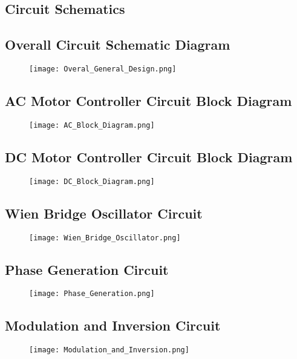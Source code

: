 \documentclass[12pt]{article}
\begin{document}
\begin{appendices}
\pagebreak

\section{Circuit Schematics}

\subsection{Overall Circuit Schematic Diagram}
\begin{figure}[H]
\centering
\texttt{[image: Overal\_General\_Design.png]}
\label{Overall_Design_V1}
\end{figure}
\subsection{AC Motor Controller Circuit Block Diagram}
\begin{figure}[H]
\centering
\texttt{[image: AC\_Block\_Diagram.png]}
\label{Overall_Design_V1}
\end{figure}
\subsection{DC Motor Controller Circuit Block Diagram}
\begin{figure}[H]
\centering
\texttt{[image: DC\_Block\_Diagram.png]}
\label{Overall_Design_V1}
\end{figure}
\subsection{Wien Bridge Oscillator Circuit}
\begin{figure}[H]
\centering
\texttt{[image: Wien\_Bridge\_Oscillator.png]}
\label{Overall_Design_V1}
\end{figure}
\subsection{Phase Generation Circuit}
\begin{figure}[H]
\centering
\texttt{[image: Phase\_Generation.png]}
\label{Overall_Design_V1}
\end{figure}
\subsection{Modulation and Inversion Circuit}
\begin{figure}[H]
\centering
\texttt{[image: Modulation\_and\_Inversion.png]}
\label{Overall_Design_V1}
\end{figure}

\end{appendices}
\end{document}
